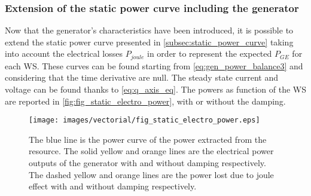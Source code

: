  \subsubsection[Power curve with generator]{Extension of the static power curve including the generator}\label{subsec:genertaor_power_curve}
 Now that the generator's characteristics have been introduced, it is possible to extend the static power curve presented in \autoref{subsec:static_power_curve} taking into account the electrical losses $P_{joule}$ in order to represent the expected $P_{GE}$ for each WS. These curves can be found starting from \autoref{eq:gen_power_balance3} and considering that the time derivative are null. The steady state current and voltage can be found thanks to \autoref{eq:q_axis_eq}. The powers as function of the \acrshort{WS} are reported in \autoref{fig:fig_static_electro_power}, with or without the damping.
\begin{figure}[htb]
  \centering
  \texttt{[image: images/vectorial/fig\_static\_electro\_power.eps]}
\caption{The blue line is the power curve of the power extracted from the resource. The solid yellow and orange lines are the electrical power outputs of the generator with and without damping respectively. The dashed yellow and orange lines are the power lost due to joule effect with and without damping respectively. }
  \label{fig:fig_static_electro_power}
\end{figure}

 